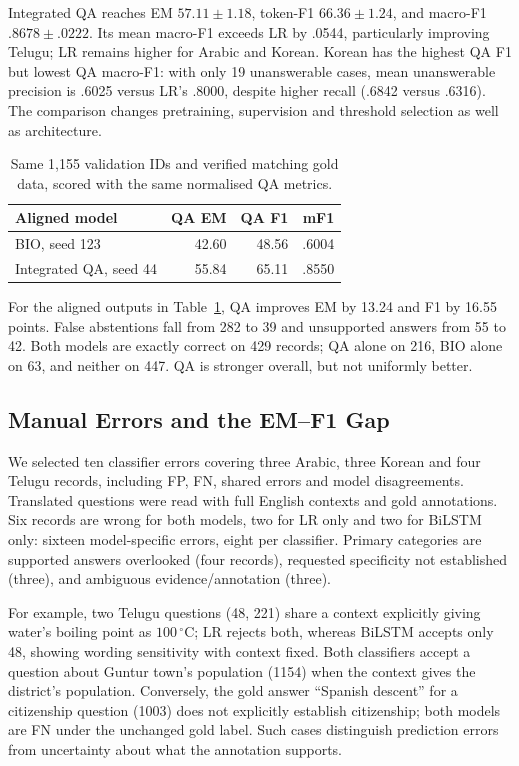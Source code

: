 \documentclass[11pt]{article}
\begin{document}
Integrated QA reaches EM $57.11\pm1.18$, token-F1 $66.36\pm1.24$, and macro-F1 $.8678\pm.0222$. Its mean macro-F1 exceeds LR by .0544, particularly improving Telugu; LR remains higher for Arabic and Korean. Korean has the highest QA F1 but lowest QA macro-F1: with only 19 unanswerable cases, mean unanswerable precision is .6025 versus LR's .8000, despite higher recall (.6842 versus .6316). The comparison changes pretraining, supervision and threshold selection as well as architecture.

\begin{table}[t]
\centering\small
\begin{tabular}{lrrr}
\toprule
Aligned model & QA EM & QA F1 & mF1\\
\midrule
BIO, seed 123 & 42.60 & 48.56 & .6004\\
Integrated QA, seed 44 & 55.84 & 65.11 & .8550\\
\bottomrule
\end{tabular}
\caption{Same 1,155 validation IDs and verified matching gold data, scored with the same normalised QA metrics.}
\label{tab:aligned}
\end{table}
For the aligned outputs in Table~\ref{tab:aligned}, QA improves EM by 13.24 and F1 by 16.55 points. False abstentions fall from 282 to 39 and unsupported answers from 55 to 42. Both models are exactly correct on 429 records; QA alone on 216, BIO alone on 63, and neither on 447. QA is stronger overall, but not uniformly better.

\subsection{Manual Errors and the EM--F1 Gap}
We selected ten classifier errors covering three Arabic, three Korean and four Telugu records, including FP, FN, shared errors and model disagreements. Translated questions were read with full English contexts and gold annotations. Six records are wrong for both models, two for LR only and two for BiLSTM only: sixteen model-specific errors, eight per classifier. Primary categories are supported answers overlooked (four records), requested specificity not established (three), and ambiguous evidence/annotation (three).

For example, two Telugu questions (48, 221) share a context explicitly giving water's boiling point as $100\,^{\circ}$C; LR rejects both, whereas BiLSTM accepts only 48, showing wording sensitivity with context fixed. Both classifiers accept a question about Guntur town's population (1154) when the context gives the district's population. Conversely, the gold answer ``Spanish descent'' for a citizenship question (1003) does not explicitly establish citizenship; both models are FN under the unchanged gold label. Such cases distinguish prediction errors from uncertainty about what the annotation supports.
\end{document}
